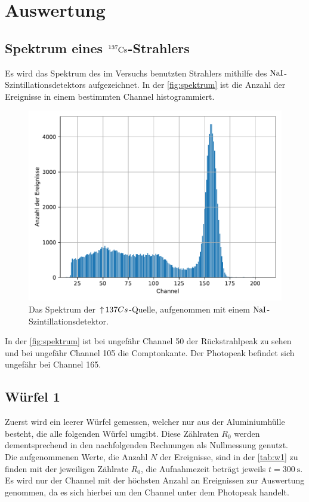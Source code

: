 \section{Auswertung}
\label{sec:Auswertung}

\subsection{Spektrum eines $\ce{^{137}Cs}$-Strahlers}

  \noindent Es wird das Spektrum des im Versuchs benutzten Strahlers mithilfe des $\ce{NaI}$-Szintillationsdetektors aufgezeichnet. 
  In der \autoref{fig:spektrum} ist die Anzahl der Ereignisse in einem bestimmten Channel histogrammiert. 

  \begin{figure}[H]
    \centering
    \includegraphics[width=\textwidth]{build/spektrum.pdf}
    \caption{Das Spektrum der $\ce^{137}Cs$-Quelle, aufgenommen mit einem $\ce{NaI}$-Szintillationsdetektor.}
    \label{fig:spektrum}
  \end{figure}

  \noindent In der \autoref{fig:spektrum} ist bei ungefähr Channel 50 der Rückstrahlpeak zu sehen und bei ungefähr Channel 105 die Comptonkante. 
  Der Photopeak befindet sich ungefähr bei Channel 165.


\subsection{Würfel 1}

  \noindent Zuerst wird ein leerer Würfel gemessen, welcher nur aus der Aluminiumhülle besteht, die alle folgenden Würfel umgibt. Diese Zählraten $R_0$ werden
  dementsprechend in den nachfolgenden Rechnungen als Nullmessung genutzt. \\
  Die aufgenommenen Werte, die Anzahl $N$ der Ereignisse, sind in der \autoref{tab:w1} zu finden mit der jeweiligen Zählrate $R_0$,  die Aufnahmezeit beträgt jeweils
   $t = \SI{300}{\second}$. Es wird nur der Channel mit der höchsten Anzahl an Ereignissen zur Auswertung genommen, da es sich hierbei um den Channel unter dem Photopeak handelt. 

